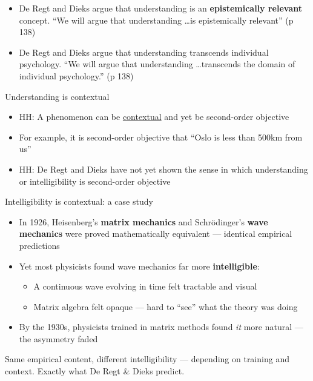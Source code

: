 \documentclass[fleqn]{beamer}
\begin{document}
\begin{frame}

  \begin{itemize}
  \item De Regt and Dieks argue that understanding is an
    \textbf{epistemically relevant} concept. \newline
    ``We will argue that understanding \dots is epistemically
    relevant'' (p 138)
  \item De Regt and Dieks argue that understanding transcends
    individual psychology. \newline
    ``We will argue that understanding \dots transcends the domain of
    individual psychology.'' (p 138)
  \end{itemize}

\end{frame}

\begin{frame}{Understanding is contextual}

  \begin{itemize}
  \item HH: A phenomenon can be \ul{contextual} and yet be
    second-order objective
  \item For example, it is second-order objective that ``Oslo is less
    than 500km from us''
  \item HH: De Regt and Dieks have not yet shown the sense in which
    understanding or intelligibility is second-order objective
  \end{itemize}

\end{frame}

\begin{frame}{Intelligibility is contextual: a case study}

  \begin{itemize}
  \item In 1926, Heisenberg's \textbf{matrix mechanics} and
    Schr\"odinger's \textbf{wave mechanics} were proved mathematically
    equivalent --- identical empirical predictions
  \item Yet most physicists found wave mechanics far more
    \textbf{intelligible}:
    \begin{itemize}
    \item A continuous wave evolving in time felt tractable and visual
    \item Matrix algebra felt opaque --- hard to ``see'' what the
      theory was doing
    \end{itemize}
  \item By the 1930s, physicists trained in matrix methods found
    \emph{it} more natural --- the asymmetry faded
  \end{itemize}

  \vspace{0.5em}
  \small Same empirical content, different intelligibility --- depending
  on training and context. Exactly what De Regt \& Dieks predict.

\end{frame}
\end{document}
